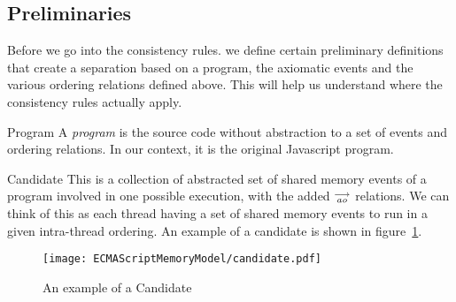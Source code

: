 \subsection{Preliminaries}
    
    Before we go into the consistency rules. we define certain preliminary definitions that create a separation based on a program, the axiomatic events and the various ordering relations defined above. This will help us understand where the consistency rules actually apply.    
    
    \begin{definition}{Program} 
        A \emph{program} is the source code without abstraction to a set of events and ordering relations. In our context, it is the original Javascript program. 
        
    \end{definition}
    
    \begin{definition}{Candidate}
        This is a collection of abstracted set of shared memory events of a program involved in one possible execution, with the added $\stackrel{\longrightarrow}{_\textit{ao}}$ relations. We can think of this as each thread having a set of shared memory events to run in a given intra-thread ordering. An example of a candidate is shown in figure~\ref{fig:candidate}.
        
    
        \begin{figure}[H]
            \centering
            \texttt{[image: ECMAScriptMemoryModel/candidate.pdf]}
            \caption{An example of a Candidate}
            \label{fig:candidate}
        \end{figure}
        
    \end{definition}
    
    
